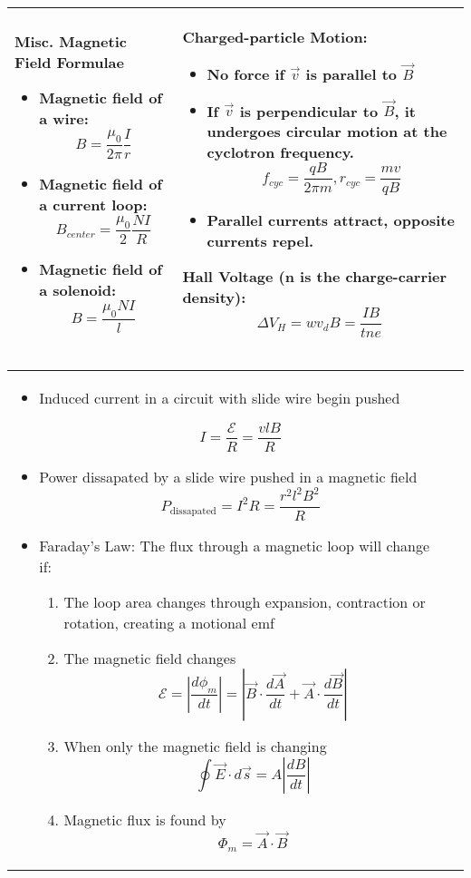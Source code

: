 \documentclass{article}
\begin{document}
\begin{center}
\begin{tabular}{|p{8cm}|p{8cm}|}
		Misc. Magnetic Field Formulae
		\begin{itemize}
			\item Magnetic field of a wire:
			      \[B = \frac{ \mu_0 }{2\pi} \frac{I}{r}\]
			\item Magnetic field of a current loop:
			      \[B_{center} = \frac{ \mu_0 }{2}\frac{NI}{R}\]
			\item Magnetic field of a solenoid:
			      \[B = \frac{ \mu_0 NI}{l}\]
		\end{itemize}

		                &

		Charged-particle Motion:
		\begin{itemize}
			\item No force if $\vec{v}$ is parallel to $\vec{B}$
			\item If $\vec{v}$ is perpendicular to $\vec{B}$, it undergoes circular motion at the cyclotron frequency.
			      \[ f_{cyc} = \frac{qB}{2\pi m}, r_{cyc} = \frac{mv}{qB}\]
			\item Parallel currents attract, opposite currents repel.
		\end{itemize}

		Hall Voltage (n is the charge-carrier density):
		\[ \Delta V_H = wv_dB = \frac{IB}{tne}\]                                            \\
		\hline
	\end{tabular}
	\begin{tabular}{|p{8cm}|p{8cm}|}
		\hline

		\begin{itemize}
			\item Induced current in a circuit with slide wire begin pushed

			      \[ I = \frac{\mathcal{E}}{R} = \frac{vlB}{R} \]

			\item Power dissapated by a slide wire pushed in a magnetic field
			      \[ P_\text{dissapated} = I^2 R = \frac{r^2 l^2 B^2}{R} \]
			\item Faraday's Law: The flux through a magnetic loop
			      will change if:

			      \begin{enumerate}
				      \item The loop area changes through expansion, contraction or rotation, creating a motional emf
				      \item The magnetic field changes
				            \[\mathcal{E} = \left\lvert \frac{d\phi_m}{dt}\right\rvert = \left\lvert \vec{B} \cdot \frac{d\vec{A}}{dt} + \vec{A} \cdot \frac{d\vec{B}}{dt}\right\rvert\]
				      \item When only the magnetic field is changing\[ \oint \vec{E} \cdot d\vec{s} = A\left\lvert \frac{dB}{dt}\right\rvert\]
				      \item Magnetic flux is found by\[ \Phi_m = \vec{A}\cdot\vec{B}\]
			      \end{enumerate}
		\end{itemize}



\end{tabular}
\end{center}
\end{document}
